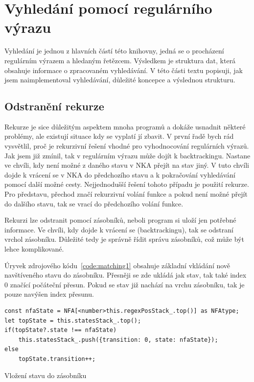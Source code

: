 \newpage

\section{Vyhledání pomocí regulárního výrazu}\label{sec:PatternMatching}

Vyhledání je jednou z hlavních částí této knihovny, jedná se o procházení regulárním výrazem a hledaným řetězcem.
Výsledkem je struktura dat, která obsahuje informace o zpracovaném vyhledávání.
V této části textu popisuji, jak jsem naimplementoval vyhledávání, důležité koncepce a výslednou strukturu.

\subsection*{Odstranění rekurze}

Rekurze je sice důležitým aspektem mnoha programů a dokáže usnadnit některé problémy, ale existují situace kdy se vyplatí jí zbavit.
V první řadě bych rád vysvětlil, proč je rekurzivní řešení vhodné pro vyhodnocování regulárních výrazů.
Jak jsem již zmínil, tak v regulárním výrazu může dojít k backtrackingu.
Nastane ve chvíli, kdy není možné z daného stavu v NKA přejít na stav jiný.
V tuto chvíli dojde k vrácení se v NKA do předchozího stavu a k pokračování vyhledávání pomocí další možné cesty.
Nejjednodušší řešení tohoto případu je použití rekurze.
Pro představu, přechod značí rekurzivní volání funkce a pokud není možné přejít do dalšího stavu, tak se vrací do předchozího volání funkce.

Rekurzi lze odstranit pomocí zásobníků, neboli program si uloží jen potřebné informace.
Ve chvíli, kdy dojde k vrácení se (backtrackingu), tak se odstraní vrchol zásobníku.
Důležité tedy je správně řídit správu zásobníků, což může být lehce komplikované.

Úryvek zdrojového kódu~\ref{code:matching1} obsahuje základní vkládání nově navštíveného stavu do zásobníku.
Přesněji se zde ukládá jak stav, tak také index 0 značící počáteční přesun.
Pokud se stav již nachází na vrchu zásobníku, tak je pouze navýšen index přesunu.

\begin{code}[!ht]
	\begin{verbatim}
const nfaState = NFA[<number>this.regexPosStack_.top()] as NFAtype;
let topState = this.statesStack_.top();
if(topState?.state !== nfaState)
	this.statesStack_.push({transition: 0, state: nfaState});
else
	topState.transition++;
	\end{verbatim}
	\caption{Vložení stavu do zásobníku}
	\label{code:matching1}
\end{code}

